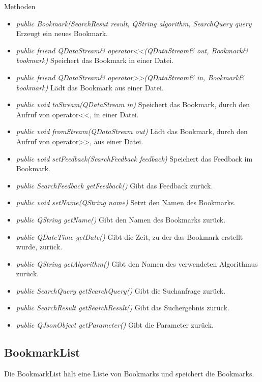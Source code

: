 Methoden
\begin{itemize}
\item \textit{public Bookmark(SearchResut result, QString algorithm, SearchQuery query} Erzeugt ein neues Bookmark.
\item \textit{public friend QDataStream\& operator<<(QDataStream\& out, Bookmark\& bookmark)} Speichert das Bookmark in einer Datei.
\item \textit{public friend QDataStream\& operator>>(QDataStream\& in, Bookmark\& bookmark)} Lädt das Bookmark aus einer Datei.
\item \textit{public void toStream(QDataStream in)} Speichert das Bookmark, durch den Aufruf von operator<<, in einer Datei.
\item \textit{public void fromStream(QDataStream out)} Lädt das Bookmark, durch den Aufruf von operator>>, aus einer Datei.
\item\textit{public void setFeedback(SearchFeedback feedback)} Speichert das Feedback im Bookmark.
\item\textit{public SearchFeedback getFeedback()} Gibt das Feedback zurück.
\item\textit{public void setName(QString name)} Setzt den Namen des Bookmarks.
\item\textit{public QString getName()} Gibt den Namen des Bookmarks zurück.
\item\textit{public QDateTime getDate()} Gibt die Zeit, zu der das Bookmark erstellt wurde, zurück.
\item\textit{public QString getAlgorithm()} Gibt den Namen des verwendeten Algorithmus zurück.
\item\textit{public SearchQuery getSearchQuery()} Gibt die Suchanfrage zurück.
\item\textit{public SearchResult getSearchResult()} Gibt das Suchergebnis zurück.
\item\textit{public QJsonObject getParameter()} Gibt die Parameter zurück.
\end{itemize}

\subsection*{BookmarkList}
Die BookmarkList hält eine Liste von Bookmarks und speichert die Bookmarks.

